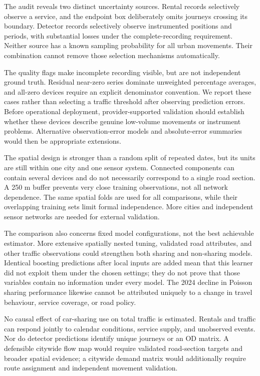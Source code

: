 \documentclass{interact}
\begin{document}
The audit reveals two distinct uncertainty sources. Rental records selectively observe a service, and the endpoint box deliberately omits journeys crossing its boundary. Detector records selectively observe instrumented positions and periods, with substantial losses under the complete-recording requirement. Neither source has a known sampling probability for all urban movements. Their combination cannot remove those selection mechanisms automatically.

The quality flags make incomplete recording visible, but are not independent ground truth. Residual near-zero series dominate unweighted percentage averages, and all-zero devices require an explicit denominator convention. We report these cases rather than selecting a traffic threshold after observing prediction errors. Before operational deployment, provider-supported validation should establish whether these devices describe genuine low-volume movements or instrument problems. Alternative observation-error models and absolute-error summaries would then be appropriate extensions.

The spatial design is stronger than a random split of repeated dates, but its units are still within one city and one sensor system. Connected components can contain several devices and do not necessarily correspond to a single road section. A 250 m buffer prevents very close training observations, not all network dependence. The same spatial folds are used for all comparisons, while their overlapping training sets limit formal independence. More cities and independent sensor networks are needed for external validation.

The comparison also concerns fixed model configurations, not the best achievable estimator. More extensive spatially nested tuning, validated road attributes, and other traffic observations could strengthen both sharing and non-sharing models. Identical boosting predictions after local inputs are added mean that this learner did not exploit them under the chosen settings; they do not prove that those variables contain no information under every model. The 2024 decline in Poisson sharing performance likewise cannot be attributed uniquely to a change in travel behaviour, service coverage, or road policy.

No causal effect of car-sharing use on total traffic is estimated. Rentals and traffic can respond jointly to calendar conditions, service supply, and unobserved events. Nor do detector predictions identify unique journeys or an OD matrix. A defensible citywide flow map would require validated road-section targets and broader spatial evidence; a citywide demand matrix would additionally require route assignment and independent movement validation.
\end{document}
